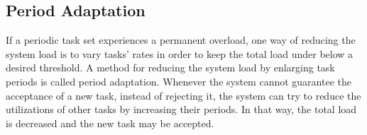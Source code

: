 


\subsection{Period Adaptation}
If a periodic task set experiences a permanent overload, one way of reducing the system load is to vary tasks' rates in order to keep the total load under below a desired threshold.
A method for reducing the system load by enlarging task periods is called period adaptation. 
Whenever the system cannot guarantee the acceptance of a new task, instead of rejecting it, the system can try to reduce the utilizations of other tasks by increasing their periods. In that way, the total load is decreased and the new task may be accepted.

